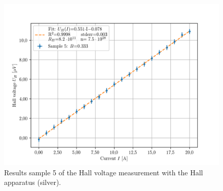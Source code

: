     \begin{figure}[!htbp]
    \begin{center}
    \includegraphics[scale=0.8]{figuren/resultaten/sample5.png}
    \end{center}
    \caption{Results sample 5 of the Hall voltage measurement with the Hall apparatus (silver).}\label{fig:silver5}
    \end{figure}
